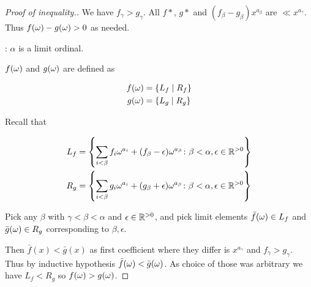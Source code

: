 \begin{proof}[Proof of inequality.]
	We have $f_\gamma > g_\gamma$.
	All $f*$, $g*$ and $(f_\beta - g_\beta) x^{a_\beta}$ are  $\ll x^{a_\gamma}$.
	Thus $f(\omega) - g(\omega) > 0$ as needed.

	: $\alpha$ is a limit ordinal.

	$f(\omega)$ and $g(\omega)$ are defined as 

	\begin{align*}
		f(\omega) &= \left\{ L_f \mid R_f \right\} \\
		g(\omega) &= \left\{ L_g \mid R_g \right\}
	\end{align*}

	Recall that

	\begin{align*}
		L_f &= \left\{ \sum_{i < \beta} f_i \omega^{a_i} + (f_\beta - \epsilon) \omega^{a_\beta}
		\colon \beta < \alpha, \epsilon \in \mathbb{R}^{>0} \right\} \\
		R_g &= \left\{ \sum_{i < \beta} g_i \omega^{a_i} + (g_\beta + \epsilon) \omega^{a_\beta}
		\colon \beta < \alpha, \epsilon \in \mathbb{R}^{>0} \right\}
	\end{align*}

	Pick any $\beta$ with $\gamma < \beta < \alpha$ and $\epsilon \in \mathbb{R}^{>0}$,
	and pick limit elements $\bar f(\omega) \in L_f$ and $\bar g(\omega) \in R_g$ corresponding to $\beta, \epsilon$.

	Then $\bar f(x) < \bar g(x)$ as first coefficient where they differ is $x^{a_\gamma}$ and $f_\gamma > g_\gamma$.
	Thus by inductive hypothesis $\bar f(\omega) < \bar g(\omega)$.
	As choice of those was arbitrary we have $L_f < R_g$ so $f(\omega) > g(\omega)$.
\end{proof}

